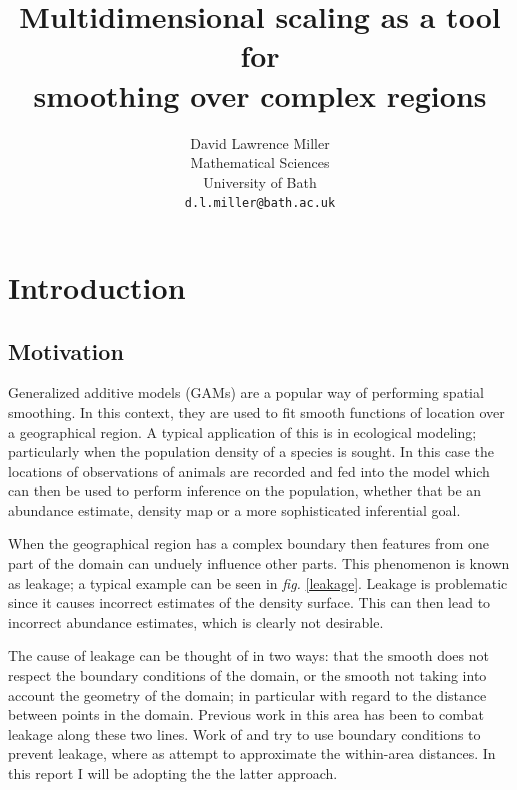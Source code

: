 \documentclass[a4paper,10pt]{article}
\title{Multidimensional scaling as a tool for \\smoothing over complex regions}
\author{David Lawrence Miller\\Mathematical Sciences\\University of Bath\\\texttt{d.l.miller@bath.ac.uk}}
\newcommand{\fig}[1]{\emph{fig.} \ref{#1}}
\begin{document}
 
 
 
\newtheorem{thm}{Theorem}[section]
 
\newtheorem{defn}{Definition}[section]
 
\maketitle

\section{Introduction}

\subsection{Motivation}

Generalized additive models (GAMs) are a popular way of performing spatial smoothing. In this context, they are used to fit smooth functions of location over a geographical region. A typical application of this is in ecological modeling; particularly when the population density of a species is sought. In this case the locations of observations of animals are recorded and fed into the model which can then be used to perform inference on the population, whether that be an abundance estimate, density map or a more sophisticated inferential goal.

When the geographical region has a complex boundary then features from one part of the domain can unduely influence other parts. This phenomenon is known as leakage; a typical example can be seen in \fig{leakage}. Leakage is problematic since it causes incorrect estimates of the density surface. This can then lead to incorrect abundance estimates, which is clearly not desirable.

The cause of leakage can be thought of in two ways: that the smooth does not respect the boundary conditions of the domain, or the smooth not taking into account the geometry of the domain; in particular with regard to the distance between points in the domain. Previous work in this area has been to combat leakage along these two lines. Work of \cite{ramsay} and \cite{soap} try to use boundary conditions to prevent leakage, where as \cite{wangranalli} attempt to approximate the within-area distances. In this report I will be adopting the the latter approach.
\end{document}
